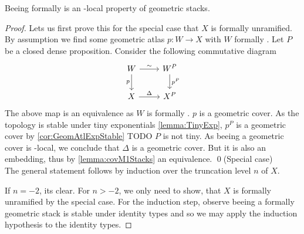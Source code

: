 \begin{prop}
	Beeing formally \etale is an \etale-local property of geometric stacks. %
\end{prop}
\begin{proof}
	Lets us first prove this for the special case that $X$ is formally unramified. 
	By assumption we find some geometric atlas $p : W \to X$ with $W$ formally \etale.
	Let $P$ be a closed dense proposition.
	Consider the following commutative diagram
	\[\begin{tikzcd}
		W & {W^P} \\
		X & {X^P}
		\arrow["\sim", from=1-1, to=1-2]
		\arrow["p"', from=1-1, to=2-1]
		\arrow["{p^P}", from=1-2, to=2-2]
		\arrow["\Delta", from=2-1, to=2-2]
	\end{tikzcd}\]
	The above map is an equivalence as $W$ is formally \etale.  $p$ is a geometric cover. As the \etale topology is stable under tiny exponentials \ref{lemma:TinyExp}, $p^P$ is a geometric cover by \ref{cor:GeomAtlExpStable} TODO $P$ is not tiny. As beeing a geometric cover is \etale-local, we conclude that $\Delta$ is a geometric cover. But it is also an embedding, thus by \ref{lemma:covM1Stacks} an equivalence. \qed (Special case)\\
	The general statement follows by induction over the truncation level $n$ of $X$.
	
	If $n = -2$, its clear. For $n > -2$, we only need to show, that $X$ is formally unramified by the special case.
	For the induction step, observe beeing a formally \etale geometric stack is stable under identity types \todocite and so we may apply the induction hypothesis to the identity types.
\end{proof}

\\

